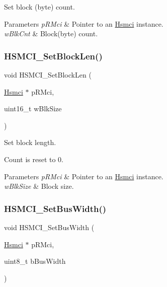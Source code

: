Set block (byte) count. 


\begin{DoxyParams}{Parameters}
{\em p\+R\+Mci} & Pointer to an \mbox{\hyperlink{structHsmci}{Hsmci}} instance. \\
\hline
{\em w\+Blk\+Cnt} & Block(byte) count. \\
\hline
\end{DoxyParams}
\mbox{\label{group__hsmci__functions_gaa5df49e8ce9e84d0a598c8869aebf844}} 
\subsubsection{\texorpdfstring{HSMCI\_SetBlockLen()}{HSMCI\_SetBlockLen()}}
{\footnotesize\ttfamily void H\+S\+M\+C\+I\+\_\+\+Set\+Block\+Len (\begin{DoxyParamCaption}\item[{\mbox{\hyperlink{structHsmci}{Hsmci}} $\ast$}]{p\+R\+Mci,  }\item[{uint16\+\_\+t}]{w\+Blk\+Size }\end{DoxyParamCaption})}



Set block length. 

Count is reset to 0.


\begin{DoxyParams}{Parameters}
{\em p\+R\+Mci} & Pointer to an \mbox{\hyperlink{structHsmci}{Hsmci}} instance. \\
\hline
{\em w\+Blk\+Size} & Block size. \\
\hline
\end{DoxyParams}
\mbox{\label{group__hsmci__functions_ga402f687cf0393baac08390e517e84033}} 
\subsubsection{\texorpdfstring{HSMCI\_SetBusWidth()}{HSMCI\_SetBusWidth()}}
{\footnotesize\ttfamily void H\+S\+M\+C\+I\+\_\+\+Set\+Bus\+Width (\begin{DoxyParamCaption}\item[{\mbox{\hyperlink{structHsmci}{Hsmci}} $\ast$}]{p\+R\+Mci,  }\item[{uint8\+\_\+t}]{b\+Bus\+Width }\end{DoxyParamCaption})}



